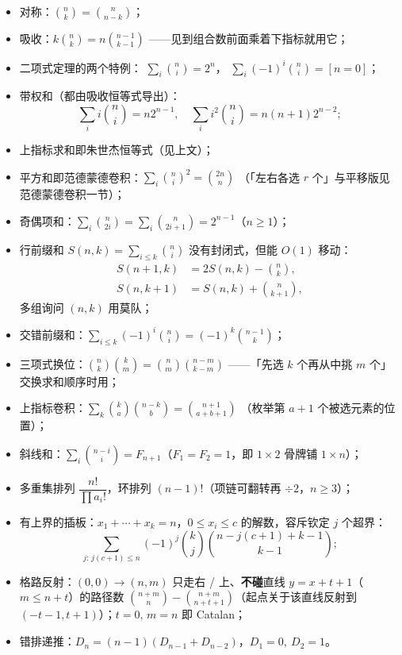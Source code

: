 		\begin{itemize}
			\item 对称：$\binom{n}{k} = \binom{n}{n-k}$；
			\item 吸收：$k\binom{n}{k} = n\binom{n-1}{k-1}$
			      ——见到组合数前面乘着下指标就用它；
			\item 二项式定理的两个特例：
			      $\sum_{i}\binom{n}{i} = 2^n$，
			      $\sum_{i}(-1)^i\binom{n}{i} = [n = 0]$；
			\item 带权和（都由吸收恒等式导出）：
			      \[
			        \sum_{i}i\binom{n}{i} = n2^{n-1},\quad
			        \sum_{i}i^{2}\binom{n}{i} = n(n+1)2^{n-2};
			      \]
			\item 上指标求和即朱世杰恒等式（见上文）；
			\item 平方和即范德蒙德卷积：$\sum_i\binom{n}{i}^2 = \binom{2n}{n}$
			      （「左右各选 $r$ 个」与平移版见范德蒙德卷积一节）；
			\item 奇偶项和：$\sum_i\binom{n}{2i} = \sum_i\binom{n}{2i+1} = 2^{n-1}$（$n\ge1$）；
			\item 行前缀和 $S(n,k)=\sum_{i\le k}\binom{n}{i}$ 没有封闭式，但能 $O(1)$ 移动：
			      \[
			        \begin{aligned}
			        	S(n+1,k) &= 2S(n,k)-\binom{n}{k},\\
			        	S(n,k+1) &= S(n,k)+\binom{n}{k+1},
			        \end{aligned}
			      \]
			      多组询问 $(n,k)$ 用莫队；
			\item 交错前缀和：$\sum_{i\le k}(-1)^i\binom{n}{i} = (-1)^k\binom{n-1}{k}$；
			\item 三项式换位：$\binom{n}{k}\binom{k}{m} = \binom{n}{m}\binom{n-m}{k-m}$
			      ——「先选 $k$ 个再从中挑 $m$ 个」交换求和顺序时用；
			\item 上指标卷积：$\sum_{k}\binom{k}{a}\binom{n-k}{b} = \binom{n+1}{a+b+1}$
			      （枚举第 $a+1$ 个被选元素的位置）；
			\item 斜线和：$\sum_i\binom{n-i}{i} = F_{n+1}$（$F_1=F_2=1$，即 $1\times2$ 骨牌铺 $1\times n$）；
			\item 多重集排列 $\dfrac{n!}{\prod a_i!}$，环排列 $(n-1)!$（项链可翻转再 $\div 2$，$n\ge3$）；
			\item 有上界的插板：$x_1+\cdots+x_k=n$，$0\le x_i\le c$ 的解数，容斥钦定 $j$ 个超界：
			      \[
			        \sum_{j:\,j(c+1)\le n}(-1)^j\binom{k}{j}\binom{n-j(c+1)+k-1}{k-1};
			      \]
			\item 格路反射：$(0,0)\to(n,m)$ 只走右 / 上、\textbf{不碰}直线 $y=x+t+1$（$m\le n+t$）的路径数
			      $\binom{n+m}{n}-\binom{n+m}{n+t+1}$（起点关于该直线反射到 $(-t-1,t+1)$）；$t=0,\,m=n$ 即 Catalan；
			\item 错排递推：$D_n=(n-1)(D_{n-1}+D_{n-2})$，$D_1=0,\ D_2=1$。
		\end{itemize}

